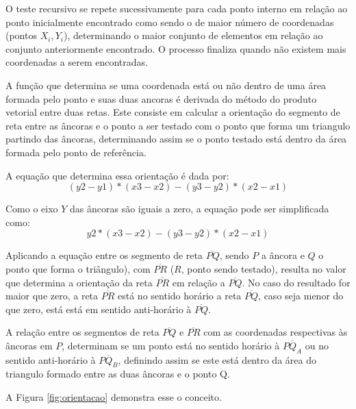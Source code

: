 \documentclass[12pt,a4paper]{article}
\begin{document}
O teste recursivo se repete sucessivamente para cada ponto interno em relação ao ponto inicialmente encontrado como sendo o de maior número de coordenadas (pontos $X_i,Y_i$), determinando o maior conjunto de elementos em relação ao conjunto anteriormente encontrado. O processo finaliza quando não existem mais coordenadas a serem encontradas.

A função que determina se uma coordenada está ou não dentro de uma área formada pelo ponto e suas duas ancoras é derivada do método do produto vetorial entre duas retas.\cite{jules:test} Este consiste em calcular a orientação do segmento de reta entre as âncoras e o ponto a ser testado com o ponto que forma um triangulo partindo das âncoras, determinando assim se o ponto testado está dentro da área formada pelo ponto de referência.

A equação que determina essa orientação é dada por:
\[(y2-y1)*(x3-x2) - (y3-y2)*(x2-x1)\]

Como o eixo $Y$ das âncoras são iguais a zero, a equação pode ser simplificada como: \[y2*(x3-x2) - (y3-y2)*(x2-x1)\]

Aplicando a equação entre os segmento de reta $\overline{PQ}$, sendo $P$ a âncora e $Q$ o ponto que forma o triângulo), com $\overline{PR}$ ($R$, ponto sendo testado), resulta no valor que determina a orientação da reta $\overline{PR}$ em relação a $\overline{PQ}$. No caso do resultado for maior que zero, a reta $\overline{PR}$ está no sentido horário a reta $\overline{PQ}$, caso seja menor do que zero, está está em sentido anti-horário à  $\overline{PQ}$.

A relação entre os segmentos de reta $\overline{PQ}$ e $\overline{PR}$ com as coordenadas respectivas às âncoras em $P$, determinam se um ponto está no sentido horário à $\overline{PQ_A}$ ou no sentido anti-horário à $\overline{PQ_B}$, definindo assim se este está dentro da área do triangulo formado entre as duas âncoras e o ponto Q.

A Figura \ref{fig:orientacao} demonstra esse o conceito.
\end{document}
